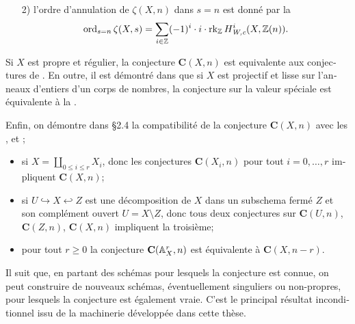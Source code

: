 \begin{otherlanguage}{french}
{\begin{enumerate}
    \item[2)] l'ordre d'annulation de $\zeta (X,n)$ dans $s = n$ est donné par
      la 
      \[ \ord_{s=n} \zeta (X,s) =
        \sum_{i\in\ZZ} (-1)^i \cdot i \cdot \rk_\ZZ H^i_\text{\it W,c} (X, \ZZ (n)). \]
    \end{enumerate} }

  \vspace{1em}

  Si $X$ est propre et régulier, la conjecture $\mathbf{C} (X,n)$ est
  equivalente aux conjectures de \cite{Flach-Morin-16}. En outre, il est
  démontré dans \cite[\S 5.6]{Flach-Morin-16} que si $X$ est projectif et lisse
  sur l'anneaux d'entiers d'un corps de nombres, la conjecture sur la valeur
  spéciale est équivalente à la .

  Enfin, on démontre dans \S 2.4 la compatibilité de la conjecture
  $\mathbf{C} (X,n)$ avec les ,
   et ;

  \begin{itemize}
  \item si $X = \coprod_{0 \le i \le r} X_i$, donc les conjectures
    $\mathbf{C} (X_i, n)$ pour tout $i = 0,\ldots,r$ impliquent
    $\mathbf{C} (X, n)$;

  \item si $U \hookrightarrow X \hookleftarrow Z$ est une décomposition de $X$
    dans un subschema fermé $Z$ et son complément ouvert $U = X\setminus Z$,
    donc tous deux conjectures sur $\mathbf{C} (U, n)$, $\mathbf{C} (Z, n)$,
    $\mathbf{C} (X, n)$ impliquent la troisième;

  \item pour tout $r\geq 0$ la conjecture $\mathbf{C} (\AA^r_X,n)$ est
    équivalente à $\mathbf{C} (X,n-r)$.
  \end{itemize}

  \vspace{1em}

  Il suit que, en partant des schémas pour lesquels la conjecture est connue, on
  peut construire de nouveaux schémas, éventuellement singuliers ou non-propres,
  pour lesquels la conjecture est également vraie. C'est le principal résultat
  inconditionnel issu de la machinerie développée dans cette thèse.

\end{otherlanguage}
